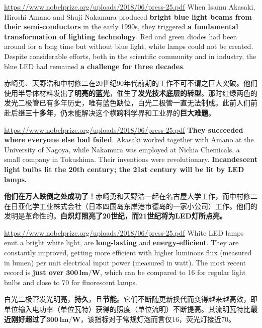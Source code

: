 \documentclass{beamer}
\newenvironment{slide}{
    \begin{frame}{\bfseries{\sectiontitle}}
}{
    \end{frame}
}
\begin{document}
\begin{slide}{\url{https://www.nobelprize.org/uploads/2018/06/press-25.pdf}}
    When Isamu Akasaki, Hiroshi Amano and Shuji Nakamura produced \textbf{bright blue light beams from their semi-conductors} in the early 1990s, they triggered \textbf{a fundamental transformation of lighting technology}. Red and green diodes had been around for a long time but without blue light, white lamps could not be created. Despite considerable efforts, both in the scientific community and in industry, the blue LED had remained \textbf{a challenge for three decades}.
    \bigskip

    赤崎勇、天野浩和中村修二在20世纪90年代前期的工作不可不谓之巨大突破。他们使用半导体材料发出了\textbf{明亮的蓝光}，催生了\textbf{发光技术底层的转型}。那时红绿两色的发光二极管已有多年历史，唯有蓝色缺位，白光二极管一直无法制成。此前人们前赴后继\textbf{三十多年}，仍未能解决这个横跨科学界和工业界的\textbf{巨大难题}。
\end{slide}

\begin{slide}{\url{https://www.nobelprize.org/uploads/2018/06/press-25.pdf}}
    \textbf{They succeeded where everyone else had failed}. Akasaki worked together with Amano at the University of Nagoya, while Nakamura was employed at Nichia Chemicals, a small company in Tokushima. Their inventions were revolutionary. \textbf{Incandescent light bulbs lit the 20th century; the 21st century will be lit by LED lamps.}
    \bigskip

    \textbf{他们在万人跌倒之处成功了}！赤崎勇和天野浩一起在名古屋大学工作，而中村修二在日亚化学工业株式会社（日本四国岛东岸港市德岛的一家小公司）工作。他们的发明是革命性的。\textbf{白炽灯照亮了\textbf{20}世纪，而\textbf{21}世纪将为\textbf{LED}灯所点亮。}
\end{slide}

\begin{slide}{\url{https://www.nobelprize.org/uploads/2018/06/press-25.pdf}}
    White LED lamps emit a bright white light, are \textbf{long-lasting} and \textbf{energy-efficient}. They are constantly improved, getting more efficient with higher luminous flux (measured in lumen) per unit electrical input power (measured in watt). The most recent record is \textbf{just over} $\mathbf{300\,lm/W}$, which can be compared to 16 for regular light bulbs and close to 70 for fluorescent lamps.
    \bigskip

    白光二极管发光明亮，\textbf{持久}，且\textbf{节能}。它们不断随更新换代而变得越来越高效，即单位输入电功率（单位瓦特）获得的照度（单位流明）不断提高。其流明瓦特比\textbf{最近刚好超过了}$\mathbf{300\,lm/W}$，该指标对于常规灯泡而言仅16，荧光灯接近70。
\end{slide}
\end{document}
